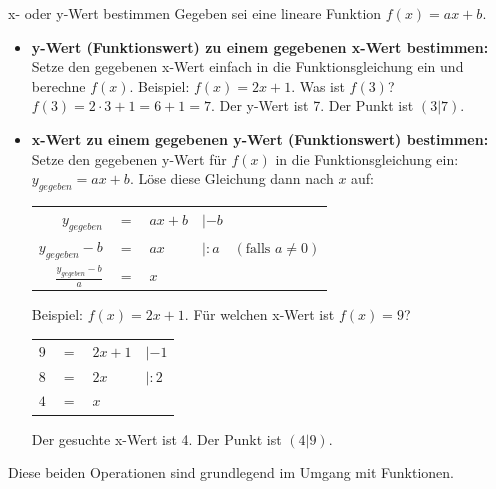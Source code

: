 \begin{merksatzumgebung}{x- oder y-Wert bestimmen}
Gegeben sei eine lineare Funktion $f(x) = ax+b$.
\begin{itemize}
    \item \textbf{y-Wert (Funktionswert) zu einem gegebenen x-Wert bestimmen:}
    Setze den gegebenen x-Wert einfach in die Funktionsgleichung ein und berechne $f(x)$.
    Beispiel: $f(x)=2x+1$. Was ist $f(3)$? $f(3) = 2 \cdot 3 + 1 = 6+1=7$. Der y-Wert ist 7. Der Punkt ist $(3|7)$.

    \item \textbf{x-Wert zu einem gegebenen y-Wert (Funktionswert) bestimmen:}
    Setze den gegebenen y-Wert für $f(x)$ in die Funktionsgleichung ein: $y_{gegeben} = ax+b$.
    Löse diese Gleichung dann nach $x$ auf:
    \begin{center}
    \begin{tabular}{r @{\,} c @{\,} l @{\quad\quad} l}
    $y_{gegeben}$ & $=$ & $ax+b$ & $|-b$ \\
    $y_{gegeben} - b$ & $=$ & $ax$ & $|:a \quad (\text{falls } a \neq 0)$ \\
    $\frac{y_{gegeben} - b}{a}$ & $=$ & $x$ & \\
    \end{tabular}
    \end{center}
    Beispiel: $f(x)=2x+1$. Für welchen x-Wert ist $f(x)=9$?
    \begin{center}
    \begin{tabular}{r @{\,} c @{\,} l @{\quad\quad} l}
    $9$ & $=$ & $2x+1$ & $|-1$ \\
    $8$ & $=$ & $2x$ & $|:2$ \\
    $4$ & $=$ & $x$ & \\
    \end{tabular}
    \end{center}
    Der gesuchte x-Wert ist 4. Der Punkt ist $(4|9)$.
\end{itemize}
\end{merksatzumgebung}

Diese beiden Operationen sind grundlegend im Umgang mit Funktionen.

